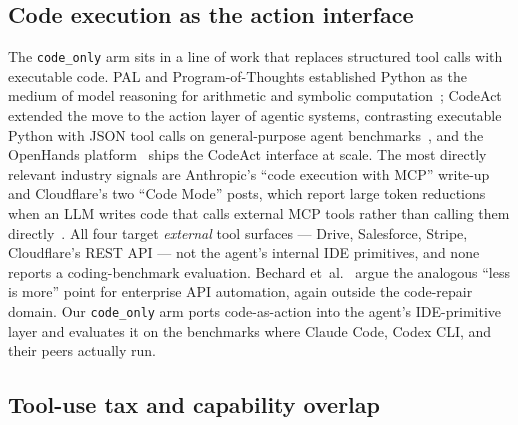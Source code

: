 \subsection{Code execution as the action interface}
\label{sec:relwork-codeact}

The \texttt{code\_only} arm sits in a line of work that replaces
structured tool calls with executable code. PAL and Program-of-Thoughts
established Python as the medium of model reasoning for arithmetic
and symbolic computation~\cite{gao2023pal,chen2023pot}; CodeAct
extended the move to the action layer of agentic systems, contrasting
executable Python with JSON tool calls on general-purpose agent
benchmarks~\cite{wang2024codeact}, and the OpenHands
platform~\cite{wang2025openhands} ships the CodeAct interface at scale.
The most directly relevant industry signals are Anthropic's
``code execution with MCP'' write-up and Cloudflare's two ``Code
Mode'' posts, which report large token reductions when an LLM writes
code that calls external MCP tools rather than calling them
directly~\cite{blog:anthropic2025codemcp,blog:cloudflare2025codemode,blog:cloudflare2026codemodemcp}.
All four target \emph{external} tool surfaces --- Drive, Salesforce,
Stripe, Cloudflare's REST API --- not the agent's internal IDE
primitives, and none reports a coding-benchmark evaluation. Bechard
et~al.~\cite{bechard2026terminal} argue the analogous ``less is
more'' point for enterprise API automation, again outside the
code-repair domain. Our \texttt{code\_only} arm ports code-as-action
into the agent's IDE-primitive layer and evaluates it on the
benchmarks where Claude Code, Codex CLI, and their peers actually
run.

\subsection{Tool-use tax and capability overlap}
\label{sec:relwork-tax}


